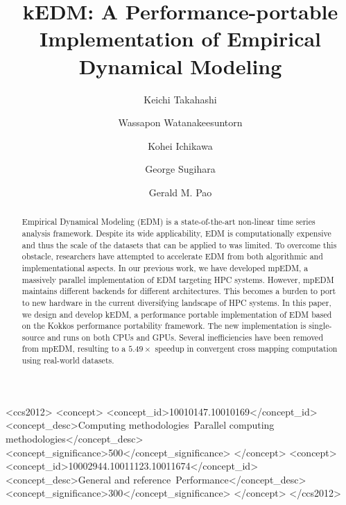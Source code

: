 \documentclass[sigconf]{acmart}
\begin{document}


\title{kEDM: A Performance-portable Implementation of Empirical Dynamical Modeling}

\author{Keichi Takahashi}
\author{Wassapon Watanakeesuntorn}
\author{Kohei Ichikawa}

\author{George Sugihara}

\author{Gerald M. Pao}

\begin{abstract}
Empirical Dynamical Modeling (EDM) is a state-of-the-art non-linear time
series analysis framework. Despite its wide applicability, EDM is
computationally expensive and thus the scale of the datasets that can be
applied to was limited. To overcome this obstacle, researchers have attempted
to accelerate EDM from both algorithmic and implementational aspects. In our
previous work, we have developed mpEDM, a massively parallel implementation of
EDM targeting HPC systems. However, mpEDM maintains different backends for
different architectures. This becomes a burden to port to new hardware in the
current diversifying landscape of HPC systems. In this paper, we design and
develop kEDM, a performance portable implementation of EDM based on the Kokkos
performance portability framework. The new implementation is single-source and
runs on both CPUs and GPUs. Several inefficiencies have been removed from
mpEDM, resulting to a $5.49\times$ speedup in convergent cross mapping
computation using real-world datasets.
\end{abstract}


\begin{CCSXML}
<ccs2012>
   <concept>
       <concept_id>10010147.10010169</concept_id>
       <concept_desc>Computing methodologies~Parallel computing methodologies</concept_desc>
       <concept_significance>500</concept_significance>
       </concept>
   <concept>
       <concept_id>10002944.10011123.10011674</concept_id>
       <concept_desc>General and reference~Performance</concept_desc>
       <concept_significance>300</concept_significance>
       </concept>
 </ccs2012>
\end{CCSXML}
\end{document}
